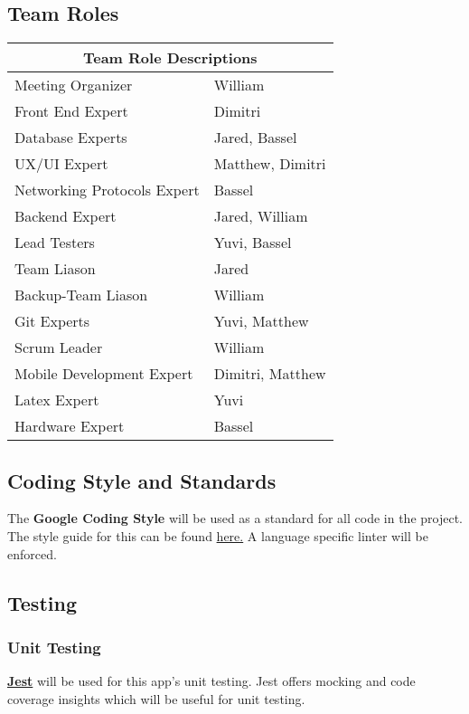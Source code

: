 \documentclass{article}
\begin{document}
\subsection{Team Roles}
\begin{tabular}{ |p{5cm}|p{8cm}| }
	\hline
	\multicolumn{2}{|c|}{Team Role Descriptions} \\
	\hline
	Meeting Organizer & William \\
	\hline
	Front End Expert & Dimitri \\
	\hline
	Database Experts  & Jared, Bassel \\
	\hline
	UX/UI Expert & Matthew, Dimitri \\
	\hline
	Networking Protocols Expert & Bassel \\
	\hline
	Backend Expert & Jared, William \\
	\hline
	Lead Testers & Yuvi, Bassel \\
	\hline
	Team Liason & Jared \\
	\hline
	Backup-Team Liason & William \\
	\hline
	Git Experts & Yuvi, Matthew\\
	\hline
	Scrum Leader & William \\
	\hline
	Mobile Development Expert & Dimitri, Matthew \\
	\hline
	Latex Expert & Yuvi \\
	\hline
	Hardware Expert & Bassel \\
	\hline
\end{tabular}

\subsection{Coding Style and Standards}
The \textbf{Google Coding Style} will be used as a standard for all code in the project. \\
The style guide for this can be found \hyperlink{https://google.github.io/styleguide/}{here.}
A language specific linter will be enforced.

\subsection{Testing}

\subsubsection {Unit Testing}
\textbf{\href{https://jestjs.io/}{Jest}} will be used for this app's unit testing. Jest offers mocking and code coverage insights which will be useful for unit testing.
\end{document}
